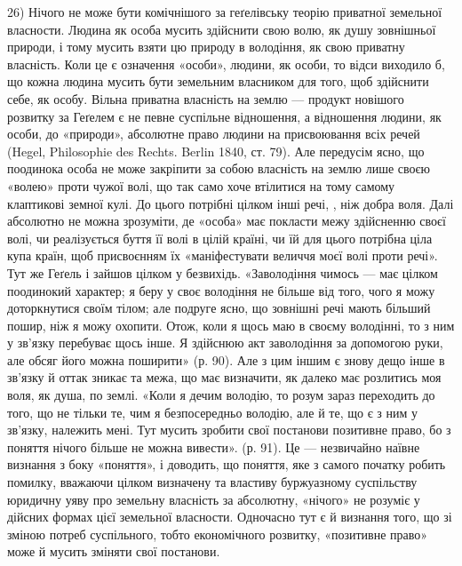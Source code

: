 26) Нічого не може бути комічнішого за геґелівську теорію приватної земельної власности. Людина
як особа мусить здійснити свою волю, як душу зовнішньої природи, і тому мусить взяти цю
природу в володіння, як свою приватну власність. Коли це є означення «особи», людини, як особи,
то відси виходило б, що кожна людина мусить бути земельним власником для того, щоб здійснити себе,
як особу. Вільна приватна власність на землю — продукт новішого розвитку за Геґелем є не певне
суспільне відношення, а відношення людини, як особи, до «природи», абсолютне право людини на
присвоювання
всіх речей (Hegel, Philosophie des Rechts. Berlin 1840, ст. 79). Але передусім ясно, що поодинока
особа не може закріпити за собою власність на землю лише своєю «волею» проти чужої волі, що
так само хоче втілитися на тому самому клаптикові земної кулі. До цього потрібні цілком інші речі, ,
ніж добра воля. Далі абсолютно не можна зрозуміти, де «особа» має покласти межу здійсненню своєї
волі, чи реалізується буття її волі в цілій країні, чи їй для цього потрібна ціла купа країн, щоб
присвоєнням
їх «маніфестувати величчя моєї волі проти речі». Тут же Геґель і зайшов цілком у безвихідь.
«Заволодіння чимось — має цілком поодинокий характер; я беру у своє володіння не більше від того,
чого
я можу доторкнутися своїм тілом; але подруге ясно, що зовнішні речі мають більший пошир, ніж
я можу охопити. Отож, коли я щось маю в своєму володінні, то з ним у зв’язку перебуває щось інше.
Я здійснюю акт заволодіння за допомогою руки, але обсяг його можна поширити» (р. 90). Але з цим
іншим є знову дещо інше в зв’язку й оттак зникає та межа, що має визначити, як далеко має розлитись
моя воля, як душа, по землі. «Коли я дечим володію, то розум зараз переходить до того, що не
тільки те, чим я безпосередньо володію, але й те, що є з ним у зв'язку, належить мені. Тут мусить
зробити свої постанови позитивне право, бо з поняття нічого більше не можна вивести». (р. 91). Це —
незвичайно наївне визнання з боку «поняття», і доводить, що поняття, яке з самого початку робить
помилку, вважаючи цілком визначену та властиву буржуазному суспільству юридичну уяву про земельну
власність за абсолютну, «нічого» не розуміє у дійсних формах цієї земельної власности. Одночасно тут
є й визнання того, що зі зміною потреб суспільного, тобто економічного розвитку, «позитивне право»
може й мусить зміняти свої постанови.
